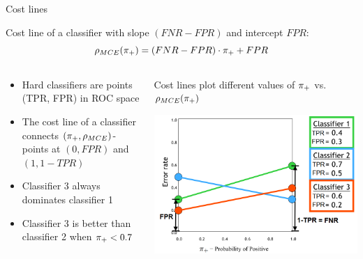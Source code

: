 


\begin{vbframe}{Cost lines}


Cost line of a classifier with slope $(FNR - FPR)$ and intercept $FPR$:
$$\rho_{MCE}(\pi_{+}) = (FNR - FPR) \cdot \pi_{+} + FPR$$

\begin{columns}[T]
\begin{column}{0.49\textwidth}

\begin{itemize}
\item Hard classifiers are points (TPR, FPR) in ROC space
\item The cost line of a classifier connects $(\pi_{+}, \rho_{MCE})$-points at
$(0, FPR)$ and $(1, 1-TPR)$
\item Classifier 3 always dominates classifier 1
\item Classifier 3 is better than classifier 2 when $\pi_{+} < 0.7$
\end{itemize}

\end{column}

\begin{column}{0.49\textwidth}
\centering
Cost lines plot different values of $\pi_{+}$ vs. $\rho_{MCE}(\pi_{+})$

\includegraphics[width=\textwidth]{figure_man/cost-curves-3.png}
\end{column}
\end{columns}
\end{vbframe}

